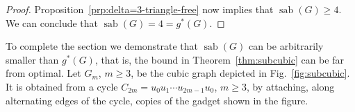 \documentclass[12pt]{article}
\DeclareMathOperator{\sab}{\mathrm{sab}}
\begin{document}
\begin{proof}
Proposition~\ref{prp:delta=3-triangle-free} now implies that $\sab(G) \ge 4$. We can conclude that $\sab(G) = 4 = g^\ast(G)$.

\end{proof}


To complete the section we demonstrate that $\sab(G)$ can be arbitrarily smaller than $g^\ast(G)$, that is, the bound in Theorem~\ref{thm:subcubic} can be far from optimal. Let $G_m$, $m \ge 3$, be the cubic graph depicted in Fig.~\ref{fig:subcubic}. It is obtained from a cycle $C_{2m}=u_0u_1\cdots u_{2m-1}u_0$, $m \ge 3$, by attaching, along alternating edges of the cycle, copies of the gadget shown in the figure. 
\end{document}
